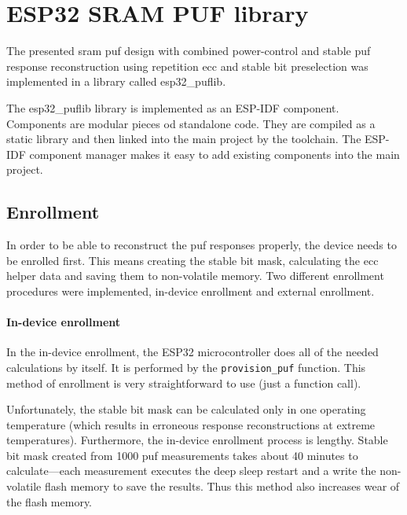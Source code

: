 \chapter{ESP32 SRAM PUF library}\label{sec:puflib}

The presented \gls{sram} \gls{puf} design with combined power-control and stable \gls{puf} response reconstruction using repetition \gls{ecc} and stable bit preselection was implemented in a library called esp32\_puflib. 

The esp32\_puflib library is implemented as an ESP-IDF component. Components are modular pieces od standalone code. They are compiled as a static library and then linked into the main project by the toolchain. The ESP-IDF component manager makes it easy to add existing components into the main project.~\cite{espidf2022}

\section{Enrollment}

In order to be able to reconstruct the \gls{puf} responses properly, the device needs to be enrolled first. This means creating the stable bit mask, calculating the \gls{ecc} helper data and saving them to non-volatile memory. Two different enrollment procedures were implemented, in-device enrollment and external enrollment.

\subsubsection*{In-device enrollment}

In the in-device enrollment, the ESP32 microcontroller does all of the needed calculations by itself. It is performed by the \lstinline{provision_puf} function. This method of enrollment is very straightforward to use (just a function call).

Unfortunately, the stable bit mask can be calculated only in one operating temperature (which results in erroneous response reconstructions at extreme temperatures). Furthermore, the in-device enrollment process is lengthy. Stable bit mask created from 1000 \gls{puf} measurements takes about 40 minutes to calculate---each measurement executes the deep sleep restart and a write the non-volatile flash memory to save the results. Thus this method also increases wear of the flash memory.

